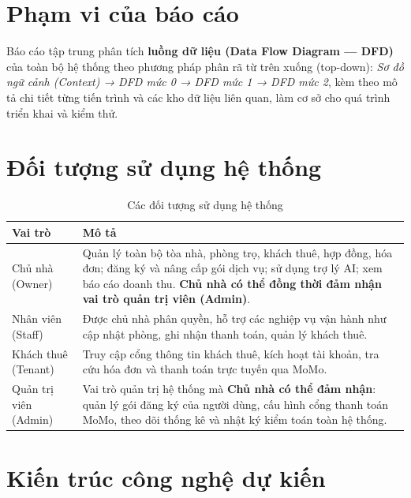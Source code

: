 \documentclass[12pt,a4paper]{report}
\begin{document}
\section{Phạm vi của báo cáo}

Báo cáo tập trung phân tích \textbf{luồng dữ liệu (Data Flow Diagram --- DFD)} của toàn bộ hệ thống theo phương pháp phân rã từ trên xuống (top-down): \emph{Sơ đồ ngữ cảnh (Context) → DFD mức 0 → DFD mức 1 → DFD mức 2}, kèm theo mô tả chi tiết từng tiến trình và các kho dữ liệu liên quan, làm cơ sở cho quá trình triển khai và kiểm thử.

\section{Đối tượng sử dụng hệ thống}

\begin{table}[H]
  \centering
  \caption{Các đối tượng sử dụng hệ thống}
  \begin{tabular}{@{}p{3.2cm}p{10.8cm}@{}}
    \toprule
    \textbf{Vai trò} & \textbf{Mô tả} \\
    \midrule
    Chủ nhà (Owner) & Quản lý toàn bộ tòa nhà, phòng trọ, khách thuê, hợp đồng, hóa đơn; đăng ký và nâng cấp gói dịch vụ; sử dụng trợ lý AI; xem báo cáo doanh thu. \textbf{Chủ nhà có thể đồng thời đảm nhận vai trò quản trị viên (Admin)}. \\
    \addlinespace
    Nhân viên (Staff) & Được chủ nhà phân quyền, hỗ trợ các nghiệp vụ vận hành như cập nhật phòng, ghi nhận thanh toán, quản lý khách thuê. \\
    \addlinespace
    Khách thuê (Tenant) & Truy cập cổng thông tin khách thuê, kích hoạt tài khoản, tra cứu hóa đơn và thanh toán trực tuyến qua MoMo. \\
    \addlinespace
    Quản trị viên (Admin) & Vai trò quản trị hệ thống mà \textbf{Chủ nhà có thể đảm nhận}: quản lý gói đăng ký của người dùng, cấu hình cổng thanh toán MoMo, theo dõi thống kê và nhật ký kiểm toán toàn hệ thống. \\
    \bottomrule
  \end{tabular}
\end{table}

\section{Kiến trúc công nghệ dự kiến}
\end{document}
